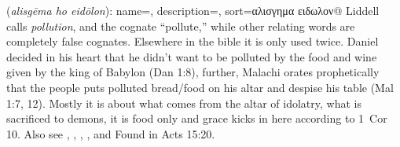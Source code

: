 \item[Idol pollution,]

(\textit{alisgēma ho eidōlon}):
{
    name=,
    description={},
    sort=αλισγημα ειδωλον@
}
Liddell calls  \emph{pollution}, and the cognate  ``pollute,'' while other relating words are completely false cognates. Elsewhere in the bible it is only used twice. Daniel decided in his heart that he didn't want to be polluted by the food and wine given by the king of Babylon (Dan 1:8), further, Malachi orates prophetically that the people puts polluted bread/food on his altar and despise his table (Mal 1:7, 12). Mostly it is about what comes from the altar of idolatry, what is sacrificed to demons, it is food only and grace kicks in here according to 1~Cor 10. Also see  , , , , and 
Found in Acts 15:20.
